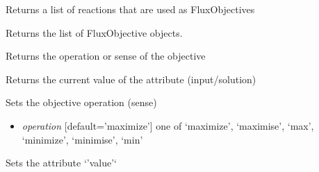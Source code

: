 \documentclass[a4paper,11pt,english]{sphinxmanual}
\begin{document}
\begin{fulllineitems}

\begin{fulllineitems}
\label{modules_doc:cbmpy.CBModel.Objective.getFluxObjectiveReactions}
Returns a list of reactions that are used as FluxObjectives

\end{fulllineitems}


\begin{fulllineitems}
\label{modules_doc:cbmpy.CBModel.Objective.getFluxObjectives}
Returns the list of FluxObjective objects.

\end{fulllineitems}


\begin{fulllineitems}
\label{modules_doc:cbmpy.CBModel.Objective.getOperation}
Returns the operation or sense of the objective

\end{fulllineitems}


\begin{fulllineitems}
\label{modules_doc:cbmpy.CBModel.Objective.getValue}
Returns the current value of the attribute (input/solution)

\end{fulllineitems}


\begin{fulllineitems}
\label{modules_doc:cbmpy.CBModel.Objective.setOperation}
Sets the objective operation (sense)
\begin{itemize}
\item {} 
\emph{operation} {[}default='maximize'{]} one of `maximize', `maximise', `max', `minimize', `minimise', `min'

\end{itemize}

\end{fulllineitems}


\begin{fulllineitems}
\label{modules_doc:cbmpy.CBModel.Objective.setValue}
Sets the attribute `'value'`

\end{fulllineitems}


\end{fulllineitems}
\end{document}
